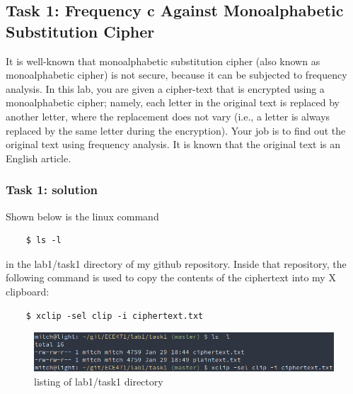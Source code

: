 \documentclass[12pt]{article}
\begin{document}
\subsection{Task 1: Frequency c Against Monoalphabetic Substitution Cipher}
    
It is well-known that monoalphabetic substitution cipher (also known as monoalphabetic cipher) is not secure, because it
can be subjected to frequency analysis. In this lab, you are given a cipher-text that is encrypted using a monoalphabetic
cipher; namely, each letter in the original text is replaced by another letter, where the replacement does not vary
(i.e., a letter is always replaced by the same letter during the encryption). Your job is to find out the original text
using frequency analysis. It is known that the original text is an English article.

\subsubsection{Task 1: solution}

Shown below is the linux command 
\begin{verbatim}
    $ ls -l 
\end{verbatim}
in the lab1/task1 directory of my github repository. Inside that repository, the following command is used to copy the
contents of the ciphertext into my X clipboard:
\begin{verbatim}
    $ xclip -sel clip -i ciphertext.txt
\end{verbatim}

\begin{figure}[!ht]
\includegraphics[scale=0.65]{c0.png}
\caption{listing of lab1/task1 directory}
\label{fig:c0}
\end{figure}
\end{document}
